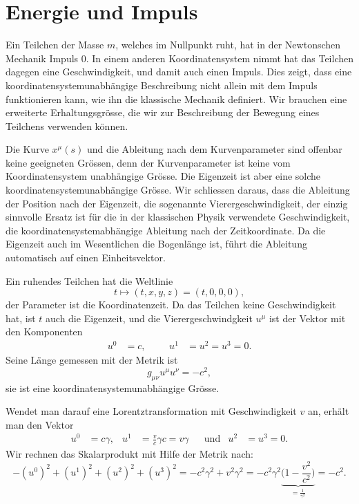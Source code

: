 \section{Energie und Impuls}
\label{skript:speziell:energieimpuls}
Ein Teilchen der Masse $m$, welches im Nullpunkt ruht, hat in der
Newtonschen Mechanik Impuls 0.
In einem anderen Koordinatensystem nimmt hat das Teilchen dagegen
eine Geschwindigkeit, und damit auch einen Impuls.
Dies zeigt, dass eine koordinatensystemunabhängige Beschreibung
nicht allein mit dem Impuls funktionieren kann, wie ihn die klassische
Mechanik definiert.
Wir brauchen eine erweiterte Erhaltungsgrösse, die wir zur Beschreibung
der Bewegung eines Teilchens verwenden können.


Die Kurve $x^\mu(s)$ und die Ableitung nach dem Kurvenparameter sind
offenbar keine geeigneten Grössen, denn der Kurvenparameter ist
keine vom Koordinatensystem unabhängige Grösse.
Die Eigenzeit ist aber eine solche koordinatensystemunabhängige
Grösse.
Wir schliessen daraus, dass die Ableitung der Position
nach der Eigenzeit, die sogenannte Vierergeschwindigkeit, der einzig
sinnvolle Ersatz ist für die in der klassischen Physik verwendete
Geschwindigkeit, die koordinatensystemabhängige Ableitung nach der
Zeitkoordinate.
Da die Eigenzeit auch im Wesentlichen die Bogenlänge ist, führt die
Ableitung automatisch auf einen Einheitsvektor.

Ein ruhendes Teilchen hat die Weltlinie
\[
t\mapsto (t, x, y, z)=(t,0,0,0),
\]
der Parameter ist die Koordinatenzeit.
Da das Teilchen keine Geschwindigkeit hat, ist $t$ auch die Eigenzeit,
und die Vierergeschwindgkeit $u^\mu$ ist der Vektor mit den
Komponenten
\[
\begin{aligned}
u^0 &= c,
&&&
u^1&=u^2=u^3 = 0.
\end{aligned}
\]
Seine Länge gemessen mit der Metrik ist
\[
g_{\mu\nu}u^\mu u^\nu=-c^2,
\]
sie ist eine koordinatensystemunabhängige Grösse.

Wendet man darauf eine Lorentztransformation mit Geschwindigkeit $v$ an,
erhält man den Vektor
\[
\begin{aligned}
u^0
&=
c\gamma,
&
u^1
&=
\frac{v}{c}\gamma c
=v\gamma
&&\text{und}
&
u^2&=u^3=0.
\end{aligned}
\]
Wir rechnen das Skalarprodukt mit Hilfe der Metrik nach:
\[
-(u^0)^2 + (u^1)^2 + (u^2)^2 + (u^3)^2
=
-c^2\gamma^2 + v^2\gamma^2
=
-c^2\gamma^2
\underbrace{\biggl(1-\frac{v^2}{c^2}\biggr)}_{\displaystyle=\frac{1}{\gamma^2}}
=
-c^2.
\]

